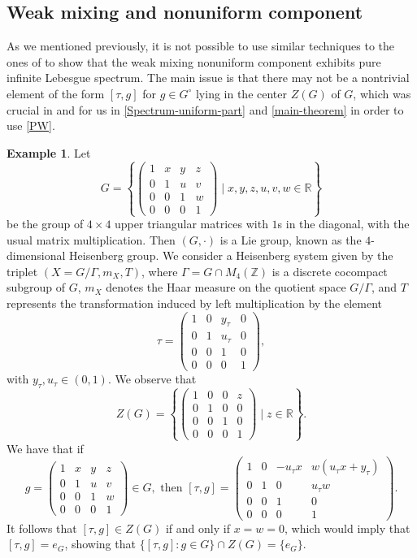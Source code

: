 \documentclass[letter, 11pt]{article}
\theoremstyle{definition}
\newtheorem{example}[theorem]{Example}
\theoremstyle{plain}
\newcommand{\Z}{\mathbb{Z}}
\newcommand{\R}{\mathbb{R}}
\newcommand{\1}{\mathbbm{1}}
\begin{document}
\subsection{Weak mixing and nonuniform component}
As we mentioned previously, it is not possible to use similar techniques to the ones of \cite{MR4797105} to show that the weak mixing nonuniform component exhibits pure infinite Lebesgue spectrum.
The main issue is that there may not be a nontrivial element of the form $[\tau,g]$ for $g\in G^\circ$ lying in the center $Z(G)$ of $G$, which was crucial in \cite{MR4797105} and for us in \cref{Spectrum-uniform-part} and \cref{main-theorem} in order to use \cref{PW}.
\begin{example}
 Let
\[
G = \left\{ \begin{pmatrix}
1 & x & y & z  \\
0 & 1 & u & v \\
0 & 0 & 1 & w \\
0 & 0 & 0 & 1
\end{pmatrix} \mid x, y, z,u,v,w \in \R \right\}
\]
be the group of $4\times 4$ upper triangular matrices with $1$s in the diagonal, with the usual matrix multiplication. Then \( (G, \cdot) \) is a Lie group, known as the $4$-dimensional Heisenberg group. We consider a Heisenberg system given by the triplet \((X=G / \Gamma, m_X, T)\), where \(\Gamma=G \cap M_{4}(\Z)\) is a discrete cocompact subgroup of \(G\), \( m_X \) denotes the Haar measure on the quotient space \( G / \Gamma \), and \( T \) represents the transformation induced by left multiplication by the element
   $$\tau =  \begin{pmatrix}
1 & 0 & y_\tau & 0 \\
0 & 1 & u_\tau & 0 \\
0 & 0 & 1 & 0 \\
0 & 0 & 0 & 1
\end{pmatrix},$$
with $y_\tau,u_\tau\in(0,1)$. We observe that 
$$Z(G)= \left\{ \begin{pmatrix}
1 & 0 & 0 & z  \\
0 & 1 & 0 & 0 \\
0 & 0 & 1 & 0 \\
0 & 0 & 0 & 1
\end{pmatrix} \mid z \in \R \right\}.$$
We have that if
$$g=\begin{pmatrix}
1 & x & y & z  \\
0 & 1 & u & v \\
0 & 0 & 1 & w \\
0 & 0 & 0 & 1
\end{pmatrix} \in G, \text{ then } [\tau,g]= \begin{pmatrix}
1 & 0 & -u_\tau x & w(u_\tau x+ y_\tau)  \\
0 & 1 & 0 & u_\tau w \\
0 & 0 & 1 & 0 \\
0 & 0 & 0 & 1
\end{pmatrix}. $$
It follows that $[\tau,g]\in Z(G)$ if and only if $x=w=0$, which would imply that $[\tau,g]=e_G$, showing that $\{[\tau,g] : g\in G\}\cap Z(G)= \{e_G\}$. 
\end{example}
\end{document}
